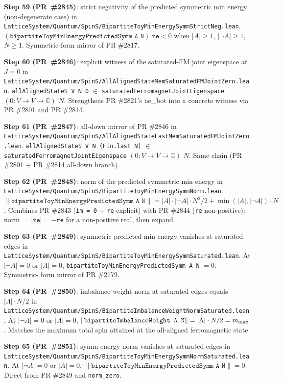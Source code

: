 \documentclass[a4paper,11pt]{article}
\begin{document}
\textbf{Step 59 (PR~\#2845)}: strict negativity of the predicted
symmetric min energy (non-degenerate case) in
\texttt{LatticeSystem/Quantum/SpinS/BipartiteToyMinEnergySymmStrictNeg.lean}.
$(\texttt{bipartiteToyMinEnergyPredictedSymm A N}).\texttt{re} < 0$
when $|A| \ge 1$, $|\neg A| \ge 1$, $N \ge 1$. Symmetric-form
mirror of PR \#2817.

\textbf{Step 60 (PR~\#2846)}: explicit witness of the saturated-FM
joint eigenspace at $J = 0$ in
\texttt{LatticeSystem/Quantum/SpinS/AllAlignedStateMemSaturatedFMJointZero.lean}.
\texttt{allAlignedStateS V N 0} $\in$
\texttt{saturatedFerromagnetJointEigenspace} $(0 : V \to V \to
\mathbb C)$ $N$. Strengthens PR \#2821's ne\_bot into a concrete
witness via PR \#2801 and PR \#2814.

\textbf{Step 61 (PR~\#2847)}: all-down mirror of PR \#2846 in
\texttt{LatticeSystem/Quantum/SpinS/AllAlignedStateLastMemSaturatedFMJointZero.lean}.
\texttt{allAlignedStateS V N (Fin.last N)} $\in$
\texttt{saturatedFerromagnetJointEigenspace} $(0 : V \to V \to
\mathbb C)$ $N$. Same chain (PR \#2801 + PR \#2814 all-down
branch).

\textbf{Step 62 (PR~\#2848)}: norm of the predicted symmetric
min energy in
\texttt{LatticeSystem/Quantum/SpinS/BipartiteToyMinEnergySymmNorm.lean}.
$\|\texttt{bipartiteToyMinEnergyPredictedSymm A N}\| = |A| \cdot
|\neg A| \cdot N^2 / 2 + \min(|A|, |\neg A|) \cdot N$. Combines PR
\#2843 (\texttt{im = 0} + \texttt{re} explicit) with PR \#2844
(\texttt{re} non-positive): norm $= |\texttt{re}| = -\texttt{re}$
for a non-positive real, then expand.

\textbf{Step 63 (PR~\#2849)}: symmetric predicted min energy
vanishes at saturated edges in
\texttt{LatticeSystem/Quantum/SpinS/BipartiteToyMinEnergySymmSaturated.lean}.
At $|\neg A| = 0$ or $|A| = 0$,
\texttt{bipartiteToyMinEnergyPredictedSymm A N} $= 0$. Symmetric-
form mirror of PR \#2779.

\textbf{Step 64 (PR~\#2850)}: imbalance-weight norm at saturated
edges equals $|\Lambda| \cdot N / 2$ in
\texttt{LatticeSystem/Quantum/SpinS/BipartiteImbalanceWeightNormSaturated.lean}.
At $|\neg A| = 0$ or $|A| = 0$,
$\|\texttt{bipartiteImbalanceWeight A N}\| = |\Lambda| \cdot N / 2
= m_{\rm max}$. Matches the maximum total spin attained at the
all-aligned ferromagnetic state.

\textbf{Step 65 (PR~\#2851)}: symm-energy norm vanishes at
saturated edges in
\texttt{LatticeSystem/Quantum/SpinS/BipartiteToyMinEnergySymmNormSaturated.lean}.
At $|\neg A| = 0$ or $|A| = 0$,
$\|\texttt{bipartiteToyMinEnergyPredictedSymm A N}\| = 0$.
Direct from PR \#2849 and \texttt{norm\_zero}.
\end{document}
